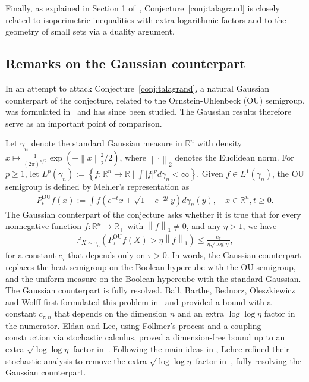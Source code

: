 \documentclass[11pt]{article}
\theoremstyle{named}
\theoremstyle{plain}
\newcommand{\defn}{:=}
\newcommand{\real}{\ensuremath{\mathbb{R}}}
\newcommand{\Prob}{\ensuremath{{\mathbb{P}}}}
\newcommand{\braces}[1]{\left\{ #1 \right \}}
\newcommand{\abss}[1]{\left| #1 \right |}
\newcommand{\vecnorm}[2]{\left\| #1\right\|_{#2}}
\begin{document}
Finally, as explained in Section 1 of~\cite{eldan2018regularization}, Conjecture~\ref{conj:talagrand} is closely related to isoperimetric inequalities with extra logarithmic factors and to the geometry of small sets via a duality argument.

\subsection{Remarks on the Gaussian counterpart}
In an attempt to attack Conjecture~\ref{conj:talagrand}, a natural Gaussian counterpart of the conjecture, related to the Ornstein-Uhlenbeck (OU) semigroup, was formulated in~\cite{ball2013l1} and has since been studied. The Gaussian results therefore serve as an important point of comparison.

Let $\gamma_n$ denote the standard Gaussian measure in $\real^n$ with density $x \mapsto \frac{1}{(2\pi)^{n/2}} \exp(-\vecnorm{x}{2}^2/2)$, where $\vecnorm{\cdot}{2}$ denotes the Euclidean norm. For $p \geq 1$, let $L^p(\gamma_n) \defn \braces{f: \real^n \to \real \mid \int \abss{f}^p d\gamma_n < \infty}$. Given $f \in L^1(\gamma_n)$, the OU semigroup is defined by Mehler's representation as
\begin{align*}
  P_t^{\text{OU}} f(x) \defn \int f(e^{-t}x + \sqrt{1-e^{-2t}} y) d\gamma_n(y), \quad x \in \real^n, t \geq 0. 
\end{align*}
The Gaussian counterpart of the conjecture asks whether it is true that for every nonnegative function $f: \real^n \to \real_+$ with $\vecnorm{f}{1} \neq 0$, and any $\eta > 1$, we have 
\begin{align}
  \label{eq:Gaussian_conj}
  \Prob_{X \sim \gamma_n}(P^{\text{OU}}_\tau f(X) > \eta \vecnorm{f}{1} ) \leq \frac{c_\tau}{\eta \sqrt{\log \eta}},
\end{align}
for a constant $c_\tau$ that depends only on $\tau > 0$. In words, the Gaussian counterpart replaces the heat semigroup on the Boolean hypercube with the OU semigroup, and the uniform measure on the Boolean hypercube with the standard Gaussian. 
The Gaussian counterpart is fully resolved. Ball, Barthe, Bednorz, Oleszkiewicz and Wolff first formulated this problem in~\cite{ball2013l1} and provided a bound with a constant $c_{\tau, n}$ that depends on the dimension $n$ and an extra $\log \log \eta$ factor in the numerator. Eldan and Lee, using F\"ollmer's process and a coupling construction via stochastic calculus, proved a dimension-free bound up to an extra $\sqrt{\log\log \eta}$ factor in~\cite{eldan2018regularization}. Following the main ideas in \cite{eldan2018regularization}, Lehec refined their stochastic analysis to remove the extra $\sqrt{\log\log \eta}$ factor in~\cite{lehec2016regularization}, fully resolving the Gaussian counterpart.
\end{document}
